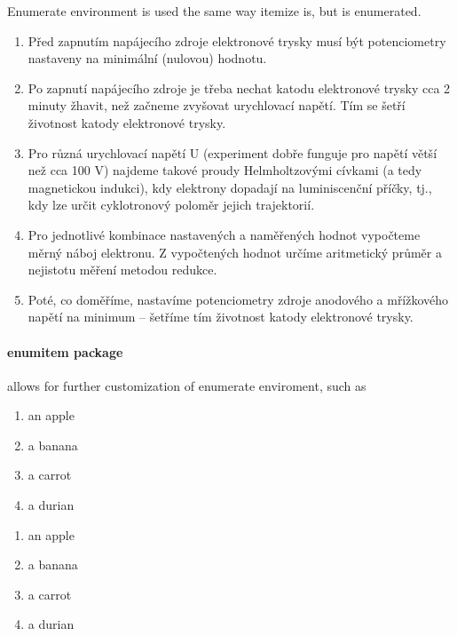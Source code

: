 \documentclass[11pt,a4paper]{report}
\theoremstyle{remark}
\theoremstyle{definition}
\begin{document}
				\noindent
				Enumerate environment is used the same way itemize is, but is enumerated.
				\begin{enumerate}
					\item Před zapnutím napájecího zdroje elektronové trysky musí být potenciometry nastaveny na minimální (nulovou) hodnotu.
					
					\item Po zapnutí napájecího zdroje je třeba nechat katodu elektronové trysky cca 2 minuty žhavit, než začneme zvyšovat urychlovací napětí. Tím se šetří životnost katody elektronové trysky.
					
					\item Pro různá urychlovací napětí U (experiment dobře funguje pro napětí větší než cca 100 V) najdeme takové proudy Helmholtzovými cívkami (a tedy magnetickou indukci), kdy elektrony dopadají na luminiscenční příčky, tj., kdy lze určit cyklotronový poloměr jejich trajektorií.
					
					\item Pro jednotlivé kombinace nastavených a naměřených hodnot vypočteme měrný náboj elektronu. Z vypočtených hodnot určíme aritmetický průměr a nejistotu měření metodou redukce.
					
					\item Poté, co doměříme, nastavíme potenciometry zdroje anodového a mřížkového napětí na minimum – šetříme tím životnost katody elektronové trysky.
				\end{enumerate}
				
				\paragraph{enumitem package} allows for further customization of enumerate enviroment, such as
					\begin{enumerate}[label=(\alph*)]
						\item an apple
						\item a banana
						\item a carrot
						\item a durian
					\end{enumerate}
					
					\begin{enumerate}[label=(\Alph*)]
						\item an apple
						\item a banana
						\item a carrot
						\item a durian
					\end{enumerate}
					
\end{document}
